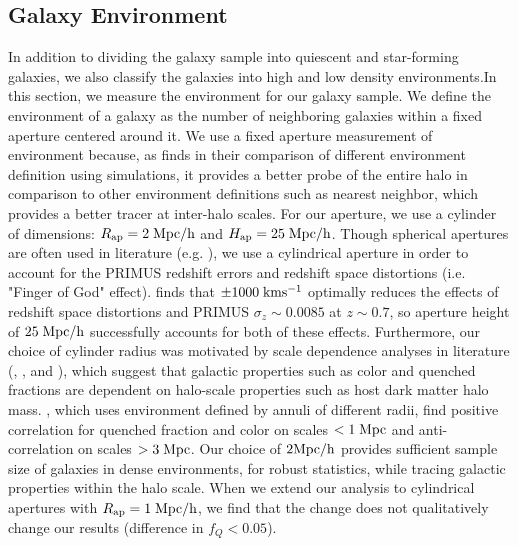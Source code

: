 \documentclass{emulateapj}
\begin{document}
\subsection{Galaxy Environment} \label{sec:environment}
In addition to dividing the galaxy sample into quiescent and star-forming galaxies, we also classify the galaxies into high and low density environments.In this section, we measure the environment for our galaxy sample. We define the environment of a galaxy as the number of neighboring galaxies within a fixed aperture centered around it. We use a fixed aperture measurement of environment because, as \cite{Muldrew:2012aa} finds in their comparison of different environment definition using simulations, it provides a better probe of the entire halo in comparison to other environment definitions such as nearest neighbor, which provides a better tracer at inter-halo scales. For our aperture, we use a cylinder of dimensions: $R_{\rm{ap}} = 2 \; \rm{Mpc}/h$ and $H_{\rm{ap}} = 25 \; \rm{Mpc}/h$. Though spherical apertures are often used in literature (e.g. \cite{Croton:2005aa}), we use a cylindrical aperture in order to account for the PRIMUS redshift errors and redshift space distortions (i.e. "Finger of God" effect). \cite{Cooper:2005aa} finds that $\pm 1000 \; \rm{km} \rm{s^{-1}}$ optimally reduces the effects of redshift space distortions and PRIMUS $\sigma_z \sim 0.0085$ at $z \sim 0.7$, so aperture height of $25 \; \rm{Mpc}/h$ successfully accounts for both of these effects. Furthermore, our choice of cylinder radius was motivated by scale dependence analyses in literature (\cite{Blanton:2006aa}, \cite{Wilman:2010aa}, and \cite{Muldrew:2012aa}), which suggest that galactic properties such as color and quenched fractions are dependent on halo-scale properties such as host dark matter halo mass. \cite{Wilman:2010aa}, which uses environment defined by annuli of different radii, find positive correlation for quenched fraction and color on scales $< 1 \; \rm{Mpc}$ and anti-correlation on scales $> 3 \; \rm{Mpc}$. Our choice of $2 \rm{Mpc}/h$ provides sufficient sample size of galaxies in dense environments, for robust statistics, while tracing galactic properties within the halo scale. When we extend our analysis to cylindrical apertures with $R_{\rm{ap}} = 1 \; \rm{Mpc}/h$, we find that the change does not qualitatively change our results (difference in $f_{Q} < 0.05$). 
\end{document}
